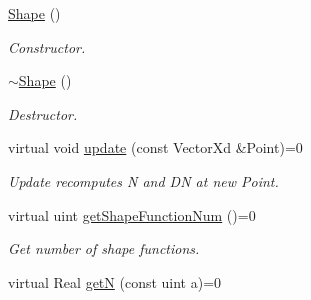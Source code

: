 \begin{DoxyCompactItemize}
\item 
\hypertarget{classvoom_1_1_shape_af394d29af8e1bedba39a0db73a258d1e}{
\hyperlink{classvoom_1_1_shape_af394d29af8e1bedba39a0db73a258d1e}{Shape} ()}
\label{classvoom_1_1_shape_af394d29af8e1bedba39a0db73a258d1e}

\begin{DoxyCompactList}\small\item\em Constructor. \item\end{DoxyCompactList}\item 
\hypertarget{classvoom_1_1_shape_adf89c69363ceb8c14a8afc5223fc3f44}{
\hyperlink{classvoom_1_1_shape_adf89c69363ceb8c14a8afc5223fc3f44}{$\sim$Shape} ()}
\label{classvoom_1_1_shape_adf89c69363ceb8c14a8afc5223fc3f44}

\begin{DoxyCompactList}\small\item\em Destructor. \item\end{DoxyCompactList}\item 
\hypertarget{classvoom_1_1_shape_a8ded544de12647543b056cec61be9f26}{
virtual void \hyperlink{classvoom_1_1_shape_a8ded544de12647543b056cec61be9f26}{update} (const VectorXd \&Point)=0}
\label{classvoom_1_1_shape_a8ded544de12647543b056cec61be9f26}

\begin{DoxyCompactList}\small\item\em Update recomputes N and DN at new Point. \item\end{DoxyCompactList}\item 
\hypertarget{classvoom_1_1_shape_aa64f4cbc91ac6d7cea4e1bdf94d5054b}{
virtual uint \hyperlink{classvoom_1_1_shape_aa64f4cbc91ac6d7cea4e1bdf94d5054b}{getShapeFunctionNum} ()=0}
\label{classvoom_1_1_shape_aa64f4cbc91ac6d7cea4e1bdf94d5054b}

\begin{DoxyCompactList}\small\item\em Get number of shape functions. \item\end{DoxyCompactList}\item 
\hypertarget{classvoom_1_1_shape_a602b85844c6952def25a4e9f22192e77}{
virtual Real \hyperlink{classvoom_1_1_shape_a602b85844c6952def25a4e9f22192e77}{getN} (const uint a)=0}
\label{classvoom_1_1_shape_a602b85844c6952def25a4e9f22192e77}


\end{DoxyCompactItemize}
